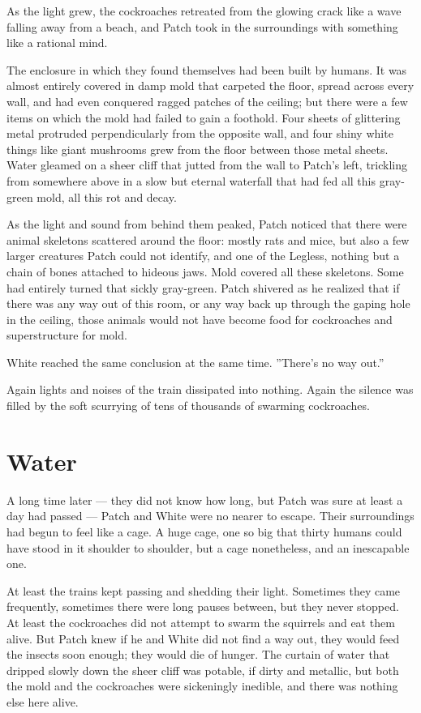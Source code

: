 \documentclass[12pt]{book}
\begin{document}
As the light grew, the cockroaches retreated from the glowing crack
like a wave falling away from a beach, and Patch took in the
surroundings with something like a rational mind.

The enclosure in which they found themselves had been built by
humans. It was almost entirely covered in damp mold that carpeted the
floor, spread across every wall, and had even conquered ragged patches
of the ceiling; but there were a few items on which the mold had
failed to gain a foothold. Four sheets of glittering metal protruded
perpendicularly from the opposite wall, and four shiny white things
like giant mushrooms grew from the floor between those metal
sheets. Water gleamed on a sheer cliff that jutted from the wall to
Patch's left, trickling from somewhere above in a slow but eternal
waterfall that had fed all this gray-green mold, all this rot and
decay.

As the light and sound from behind them peaked, Patch noticed that
there were animal skeletons scattered around the floor: mostly rats
and mice, but also a few larger creatures Patch could not identify,
and one of the Legless, nothing but a chain of bones attached to
hideous jaws. Mold covered all these skeletons. Some had entirely
turned that sickly gray-green. Patch shivered as he realized that if
there was any way out of this room, or any way back up through the
gaping hole in the ceiling, those animals would not have become food
for cockroaches and superstructure for mold.

White reached the same conclusion at the same time. ''There's no way
out.''

Again lights and noises of the train dissipated into nothing. Again
the silence was filled by the soft scurrying of tens of thousands of
swarming cockroaches.


\section{Water}

A long time later --- they did not know how long, but Patch was sure
at least a day had passed --- Patch and White were no nearer to
escape. Their surroundings had begun to feel like a cage. A huge cage,
one so big that thirty humans could have stood in it shoulder to
shoulder, but a cage nonetheless, and an inescapable one.

At least the trains kept passing and shedding their light. Sometimes
they came frequently, sometimes there were long pauses between, but
they never stopped. At least the cockroaches did not attempt to swarm
the squirrels and eat them alive. But Patch knew if he and White did
not find a way out, they would feed the insects soon enough; they
would die of hunger. The curtain of water that dripped slowly down the
sheer cliff was potable, if dirty and metallic, but both the mold and
the cockroaches were sickeningly inedible, and there was nothing else
here alive.
\end{document}
